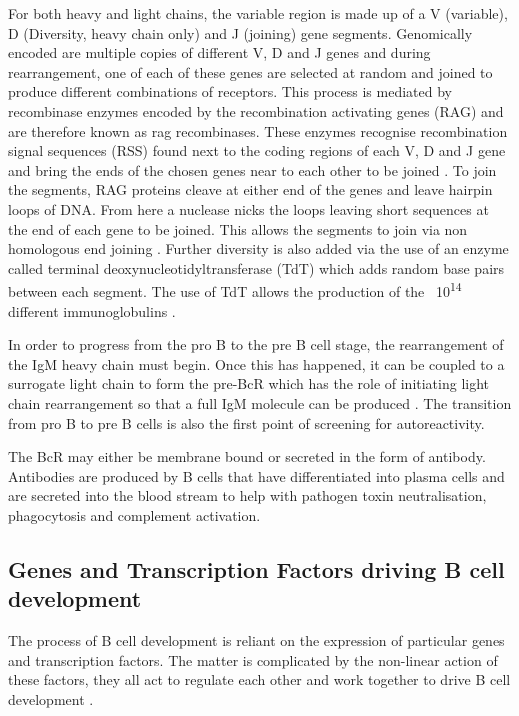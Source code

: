 For both heavy and light chains, the variable region is made up of a V (variable), D (Diversity, heavy chain only) and J (joining) gene segments. 
Genomically encoded are multiple copies of different V, D and J genes and during rearrangement, one of each of these genes are selected at random and joined to produce different combinations of receptors.
This process is mediated by recombinase enzymes encoded by the recombination activating genes (RAG) and are therefore known as rag recombinases.
These enzymes recognise recombination signal sequences (RSS) found next to the coding regions of each V, D and J gene and bring the ends of the chosen genes near to each other to be joined \citep{Fugmann2014, Oettinger1999}.
To join the segments, RAG proteins cleave at either end of the genes and leave hairpin loops of DNA.
From here a nuclease nicks the loops leaving short sequences at the end of each gene to be joined.
This allows the segments to join via non homologous end joining \citep{Schatz2011}.
Further diversity is also added via the use of an enzyme called terminal deoxynucleotidyltransferase (TdT) which adds random base pairs between each segment.
The use of TdT allows the production of the ~10\textsuperscript{14} different immunoglobulins \citep{Motea2010}.

In order to progress from the pro B to the pre B cell stage, the rearrangement of the IgM heavy chain must begin.
Once this has happened, it can be coupled to a surrogate light chain to form the pre-BcR which has the role of initiating light chain rearrangement so that a full IgM molecule can be produced \citep{Burrows2002}.
The transition from pro B to pre B cells is also the first point of screening for autoreactivity\citep{Pieper2013}.

The BcR may either be membrane bound or secreted in the form of antibody.
Antibodies are produced by B cells that have differentiated into plasma cells and are secreted into the blood stream to help with pathogen toxin neutralisation, phagocytosis and complement activation\citep{Janeway2008}.


\subsection{Genes and Transcription Factors driving B cell development}
\label{subsec:Bcellgenes}

The process of B cell development is reliant on the expression of particular genes and transcription factors.
The matter is complicated by the non-linear action of these factors, they all act to regulate each other and work together to drive B cell development \citep{Mandel2010}.

